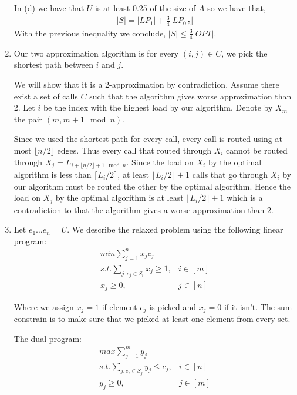 \documentclass{article}
\begin{document}
\begin{enumerate}
In (d) we have that $U$ is at least 0.25 of the size of $A$ so we have that,
\begin{align*}
|S| = |LP_1| + \frac{3}{4} |LP_{0.5}|
\end{align*} 
With the previous inequality we conclude, $|S|\le \frac{3}{4} |OPT|$.

\item 
Our two approximation algorithm is for every $(i, j) \in C$, we pick the shortest path between $i$ and $j$.

We will show that it is a 2-approximation by contradiction.
Assume there exist a set of calls $C$ such that the algorithm gives worse approximation than 2.
Let $i$ be the index with the highest load by our algorithm. Denote by $X_m$ the pair $(m, m + 1\mod n)$.

Since we used the shortest path for every call, every call is routed using at most $\lfloor n/2 \rfloor$ edges. Thus every call that routed through $X_{i}$ cannot be routed through $X_j = L_{i + \lfloor n/2 \rfloor + 1 \mod n}$. Since the load on $X_i$ by the optimal algorithm is less than $\lceil L_i / 2\rceil$, at least $\lfloor L_i / 2 \rfloor + 1$ calls that go through $X_i$ by our algorithm must be routed the other by the optimal algorithm. Hence the load on $X_j$ by the optimal algorithm is at least $\lfloor L_i / 2 \rfloor +1$ which is a contradiction to that the algorithm gives a worse approximation than 2.

\item
Let $e_1 \dots e_n = U$. We describe the relaxed problem using the following linear program:
\begin{align*}
min \sum_{j=1}^{n} x_j c_j \\
s.t. \sum_{j : e_j \in S_i} x_j \geq 1, & i \in [m]\\
x_j \geq 0, & j \in [n]
\end{align*}

Where we assign $x_j = 1$ if element $e_j$ is picked and $x_j = 0$ if it isn't. The sum constrain is to make sure that we picked at least one element from every set.

The dual program:
\begin{align*}
max \sum_{j=1}^{m} y_j \\
s.t. \sum_{j : e_i \in S_j} y_j \leq c_j, & i \in [n]\\
y_j \geq 0, & j \in [m]
\end{align*}


\end{enumerate}
\end{document}
